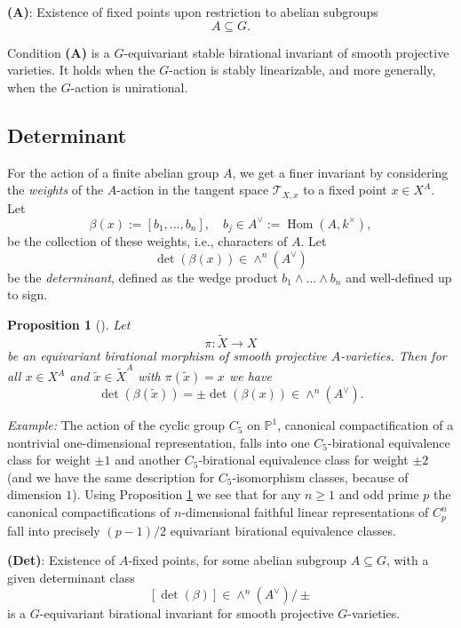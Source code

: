 \documentclass[12pt,reqno]{amsart}
\theoremstyle{plain}
\newtheorem{prop}{Proposition}[section]
\theoremstyle{remark}
\theoremstyle{definition}
\numberwithin{equation}{section}
\newcommand{\bP}{{\mathbb P}}
\newcommand{\cT}{{\mathcal T}}
\DeclareMathOperator{\Hom}{Hom}
\begin{document}
\medskip
\noindent
{\bf (A)}: Existence of fixed points upon restriction to abelian subgroups 
$$
A\subseteq G.
$$

Condition {\bf (A)} is a $G$-equivariant stable birational invariant of smooth projective varieties.
It holds when the $G$-action is stably linearizable, and more generally, when the $G$-action is unirational.


\subsection{Determinant}
\label{sect:det}
For the action of a finite abelian group $A$, we get a finer invariant by considering the {\em weights} of the $A$-action in the tangent space $\cT_{X,x}$ to a fixed point $x\in X^A$. Let 
$$
\beta(x):=[b_1,\ldots,b_n], \quad b_j\in A^\vee :=\Hom(A,k^\times), 
$$
be the collection of these weights, i.e., characters of $A$. Let
$$
\det(\beta(x)) \in \wedge^n(A^\vee)
$$
be the {\em determinant},
defined as the wedge product $b_1\wedge\dots\wedge b_n$ and well-defined up to sign.



\begin{prop}[{\cite{RYinvariant}}]
\label{prop:ry}
Let 
$$
\pi\colon \widetilde{X}\to X
$$ 
be an equivariant birational morphism of smooth projective $A$-varieties. 
Then for all $x\in X^A$ and
$\tilde x\in \widetilde{X}^A$ with $\pi(\tilde x)=x$ we have
$$
\det(\beta(\tilde{x})) = \pm \det(\beta(x))\in \wedge^n(A^\vee).
$$
\end{prop}





\medskip
\noindent
{\em Example:} The action of the cyclic group $C_5$ on $\bP^1$, canonical compactification of a nontrivial one-dimensional representation, falls into one $C_5$-birational equivalence class for weight $\pm 1$ and another $C_5$-birational equivalence class for weight $\pm 2$ (and we have the same description for $C_5$-isomorphism classes, because of dimension $1$).
Using Proposition \ref{prop:ry} we see that for any $n\ge 1$ and odd prime $p$ the canonical compactifications of $n$-dimensional faithful linear representations of $C_p^n$ fall into precisely $(p-1)/2$ equivariant birational equivalence classes.



\medskip
\noindent
{\bf (Det)}: Existence of $A$-fixed points, for some abelian subgroup $A\subseteq G$, with a given determinant class
$$
[\det(\beta)] \in \wedge^n(A^\vee) / \pm
$$
is a $G$-equivariant birational invariant for smooth projective $G$-varieties. 
\end{document}
